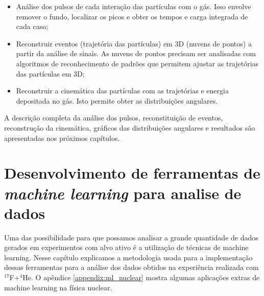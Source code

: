 \documentclass[a4paper,12pt,oneside]{book}
\begin{document}
\begin{itemize}
    \item Análise dos pulsos de cada interação das partículas com o gás. Isso envolve remover o fundo, localizar os picos e obter os tempos e carga integrada de cada caso;
    \item Reconstruir eventos (trajetória das partículas) em 3D (nuvens de pontos) a partir da análise de sinais. As nuvens de pontos precisam ser analisadas com algoritmos de reconhecimento de padrões que permitem ajustar as trajetórias das partículas em 3D;
    \item Reconstruir a cinemática das partículas com as trajetórias e energia depositada no gás. Isto permite obter as distribuições angulares. 
\end{itemize}


\par A descrição completa da análise dos pulsos, reconstituição de eventos, reconstrução da cinemática, gráficos das distribuições angulares e resultados são apresentadas nos próximos capítulos.

\chapter{Desenvolvimento de ferramentas de \textit{machine learning} para analise de dados}\label{sec:ml}

\par Uma das possibilidade para que possamos analisar a grande quantidade de dados gerados em experimentos com alvo ativo é a utilização de técnicas de machine learning. Nesse capítulo explicamos a metodologia usada para a implementação dessas ferramentas para a análise dos dados obtidos na experiência realizada com $^{17}$F+$^4$He. O apêndice \ref{appendix:ml_nuclear} mostra algumas aplicações extras de machine learning na física nuclear.
\end{document}
